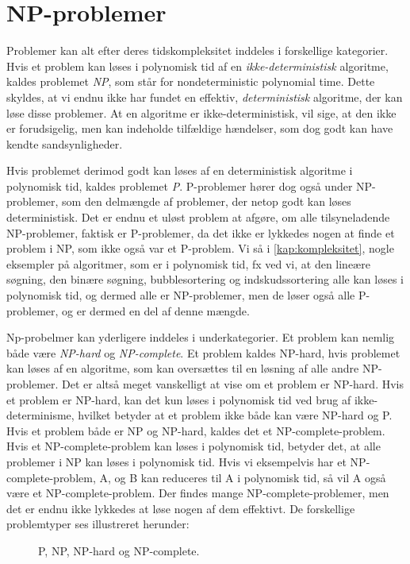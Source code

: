 \section{NP-problemer} \label{kap:np}
Problemer kan alt efter deres tidskompleksitet inddeles i forskellige kategorier. Hvis et problem kan løses i polynomisk tid af en \emph{ikke-deterministisk} algoritme, kaldes problemet \emph{NP}, som står for nondeterministic polynomial time. Dette skyldes, at vi endnu ikke har fundet en effektiv, \emph{deterministisk} algoritme, der kan løse disse problemer. At en algoritme er ikke-deterministisk, vil sige, at den ikke er forudsigelig, men kan indeholde tilfældige hændelser, som dog godt kan have kendte sandsynligheder. 


Hvis problemet derimod godt kan løses af en deterministisk algoritme i polynomisk tid, kaldes problemet \emph{P}. P-problemer hører dog også under NP-problemer, som den delmængde af problemer, der netop godt kan løses deterministisk. Det er endnu et uløst problem at afgøre, om alle tilsyneladende NP-problemer, faktisk er P-problemer, da det ikke er lykkedes nogen at finde et problem i NP, som ikke også var et P-problem. Vi så i \autoref{kap:kompleksitet}, nogle eksempler på algoritmer, som er i polynomisk tid, fx ved vi, at den lineære søgning, den binære søgning, bubblesortering og indskudssortering alle kan løses i polynomisk tid, og dermed alle er NP-problemer, men de løser også alle P-problemer, og er dermed en del af denne mængde.

Np-probelmer kan yderligere inddeles i underkategorier. Et problem kan nemlig både være \emph{NP-hard} og \emph{NP-complete}. Et problem kaldes NP-hard, hvis problemet kan løses af en algoritme, som kan oversættes til en løsning af alle andre NP-problemer. Det er altså meget vanskelligt at vise om et problem er NP-hard. Hvis et problem er NP-hard, kan det kun løses i polynomisk tid ved brug af ikke-determinisme, hvilket betyder at et problem ikke både kan være NP-hard og P.
Hvis et problem både er NP og NP-hard, kaldes det et NP-complete-problem. Hvis et NP-complete-problem kan løses i polynomisk tid, betyder det, at alle problemer i NP kan løses i polynomisk tid. Hvis vi eksempelvis har et NP-complete-problem, A, og B kan reduceres til A i polynomisk tid, så vil A også være et NP-complete-problem. Der findes mange NP-complete-problemer, men det er endnu ikke lykkedes at løse nogen af dem effektivt. De forskellige problemtyper ses illustreret herunder:

\begin{figure}[H]
\centering
	\caption{P, NP, NP-hard og NP-complete.}
	\label{fig.dijkstraexmp}
\end{figure}

